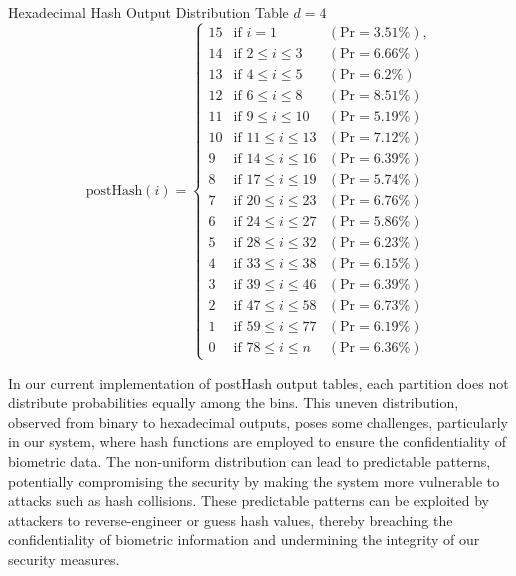 Hexadecimal Hash Output Distribution Table \(d=4\)
{
\renewcommand{\arraystretch}{1.25}
\[
\text{postHash}(i) = \left\{
\begin{array}{lll}
    \text{15} & \text{if } i = 1 & (\text{Pr} = 3.51\%), \\
    \text{14} & \text{if } 2 \leq i \leq 3 & (\text{Pr} = 6.66\%) \\
    \text{13} & \text{if } 4 \leq i \leq 5 & (\text{Pr} = 6.2\%) \\
    \text{12} & \text{if } 6 \leq i \leq 8 & (\text{Pr} = 8.51\%) 
    \\
    \text{11} & \text{if } 9 \leq i \leq 10 & (\text{Pr} = 5.19\%) \\
    \text{10} & \text{if } 11 \leq i \leq 13 & (\text{Pr} = 7.12\%) \\
    \text{9} & \text{if } 14 \leq i \leq 16 & (\text{Pr} = 6.39\%) \\
    \text{8} & \text{if } 17 \leq i \leq 19 & (\text{Pr} = 5.74\%) \\
    \text{7} & \text{if } 20 \leq i \leq 23 & (\text{Pr} = 6.76\%) \\
    \text{6} & \text{if } 24 \leq i \leq 27 & (\text{Pr} = 5.86\%) \\
    \text{5} & \text{if } 28 \leq i \leq 32 & (\text{Pr} = 6.23\%) \\
    \text{4} & \text{if } 33 \leq i \leq 38 & (\text{Pr} = 6.15\%) \\
    \text{3} & \text{if } 39 \leq i \leq 46 & (\text{Pr} = 6.39\%) \\
    \text{2} & \text{if } 47 \leq i \leq 58 & (\text{Pr} = 6.73\%) \\
    \text{1} & \text{if } 59 \leq i \leq 77 & (\text{Pr} = 6.19\%) \\
    \text{0} & \text{if } 78 \leq i \leq n & (\text{Pr} = 6.36\%)
\end{array}
\right.
\]
}

In our current implementation of postHash output tables, each partition does not distribute probabilities equally among the bins. This uneven distribution, observed from binary to hexadecimal outputs, poses some challenges, particularly in our system, where hash functions are employed to ensure the confidentiality of biometric data. The non-uniform distribution can lead to predictable patterns, potentially compromising the security by making the system more vulnerable to attacks such as hash collisions. These predictable patterns can be exploited by attackers to reverse-engineer or guess hash values, thereby breaching the confidentiality of biometric information and undermining the integrity of our security measures.

